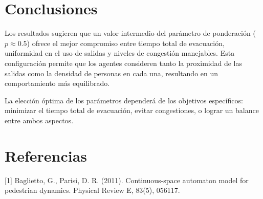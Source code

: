 \documentclass[12pt]{article}
\begin{document}
\section{Conclusiones}

Los resultados sugieren que un valor intermedio del parámetro de ponderación ($p \approx 0.5$) ofrece el mejor compromiso entre tiempo total de evacuación, uniformidad en el uso de salidas y niveles de congestión manejables. Esta configuración permite que los agentes consideren tanto la proximidad de las salidas como la densidad de personas en cada una, resultando en un comportamiento más equilibrado.

La elección óptima de los parámetros dependerá de los objetivos específicos: minimizar el tiempo total de evacuación, evitar congestiones, o lograr un balance entre ambos aspectos.

\section{Referencias}
[1] Baglietto, G., Parisi, D. R. (2011). Continuous-space automaton model for pedestrian dynamics. Physical Review E, 83(5), 056117.
\end{document}
